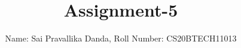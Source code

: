 \documentclass[journal,12pt,twocolumn]{IEEEtran}
\DeclareMathOperator*{\Res}{Res}
\begin{document}
\newcommand{\BEQA}{\begin{eqnarray}}
\newcommand{\EEQA}{\end{eqnarray}}
\newcommand{\define}{\stackrel{\triangle}{=}}

\raggedbottom
\setlength{\parindent}{0pt}
\providecommand{\mbf}{\mathbf}
\providecommand{\pr}[1]{\ensuremath{\Pr\left(#1\right)}}
\providecommand{\qfunc}[1]{\ensuremath{Q\left(#1\right)}}
\providecommand{\sbrak}[1]{\ensuremath{{}\left[#1\right]}}
\providecommand{\lsbrak}[1]{\ensuremath{{}\left[#1\right.}}
\providecommand{\rsbrak}[1]{\ensuremath{{}\left.#1\right]}}
\providecommand{\brak}[1]{\ensuremath{\left(#1\right)}}
\providecommand{\lbrak}[1]{\ensuremath{\left(#1\right.}}
\providecommand{\rbrak}[1]{\ensuremath{\left.#1\right)}}
\providecommand{\cbrak}[1]{\ensuremath{\left\{#1\right\}}}
\providecommand{\lcbrak}[1]{\ensuremath{\left\{#1\right.}}
\providecommand{\rcbrak}[1]{\ensuremath{\left.#1\right\}}}
\theoremstyle{remark}
\newtheorem{rem}{Remark}
\newcommand{\sgn}{\mathop{\mathrm{sgn}}}
\providecommand{\abs}[1]{\vert#1\vert}
\providecommand{\res}[1]{\Res\displaylimits_{#1}} 
\providecommand{\norm}[1]{\lVert#1\rVert}
\providecommand{\mtx}[1]{\mathbf{#1}}
\providecommand{\mean}[1]{E[ #1 ]}
\providecommand{\fourier}{\overset{\mathcal{F}}{ \rightleftharpoons}}
\providecommand{\system}{\overset{\mathcal{H}}{ \longleftrightarrow}}
\newcommand{\solution}{\noindent \textbf{Solution: }}
\newcommand{\cosec}{\,\text{cosec}\,}
\providecommand{\dec}[2]{\ensuremath{\overset{#1}{\underset{#2}{\gtrless}}}}
\newcommand{\myvec}[1]{\ensuremath{\begin{pmatrix}#1\end{pmatrix}}}
\newcommand{\mydet}[1]{\ensuremath{\begin{vmatrix}#1\end{vmatrix}}}
\makeatletter
{}
\makeatother
\let\StandardTheFigure\thefigure
\let\vec\mathbf
\renewcommand{\thefigure}{\theproblem}
\def\putbox#1#2#3{\makebox[0in][l]{\makebox[#1][l]{}\raisebox{\baselineskip}[0in][0in]{\raisebox{#2}[0in][0in]{#3}}}}
     \def\rightbox#1{\makebox[0in][r]{#1}}
     \def\centbox#1{\makebox[0in]{#1}}
     \def\topbox#1{\raisebox{-\baselineskip}[0in][0in]{#1}}
     \def\midbox#1{\raisebox{-0.5\baselineskip}[0in][0in]{#1}}
\vspace{3cm}
\title{Assignment-5}
\author{Name: Sai Pravallika Danda, Roll Number: CS20BTECH11013}
\end{document}
